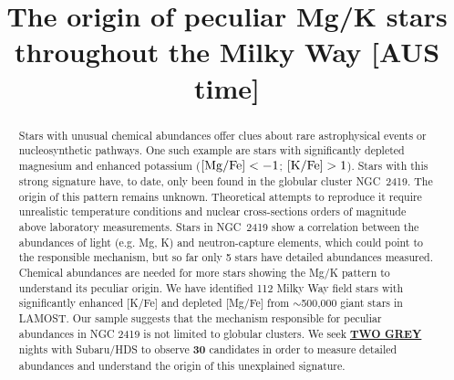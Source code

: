 \documentclass{article}
\begin{document}
\newcommand{\todo}[1]{\ul{\MakeUppercase{\textbf{#1}}}}
\newcommand{\NumStars}{30}
\newcommand{\NumNights}{two grey}
\semester{}
\proposalid{}
\receivedate{}


\title{The origin of peculiar Mg/K stars throughout the Milky Way [AUS time] }


\NormalStars

\begin{abstract}
Stars with unusual chemical abundances offer clues about rare astrophysical events or nucleosynthetic pathways. One such example are stars with significantly depleted magnesium and enhanced potassium ($[{\rm Mg/Fe}] < -1$; $[{\rm K/Fe}] > 1$). Stars with this strong signature have, to date, only been found in the globular cluster NGC~2419. The origin of this pattern remains unknown. Theoretical attempts to reproduce it require unrealistic temperature conditions and nuclear cross-sections orders of magnitude above laboratory measurements. Stars in NGC~2419 show a correlation between the abundances of light (e.g. Mg, K) and neutron-capture elements, which could point to the responsible mechanism, but so far only 5 stars have detailed abundances measured. Chemical abundances are needed for more stars showing the Mg/K pattern to understand its peculiar origin. We have identified 112 Milky Way field stars with significantly enhanced [K/Fe] and depleted [Mg/Fe] from $\sim$500,000 giant stars in LAMOST. Our sample suggests that the mechanism responsible for peculiar abundances in NGC 2419 is not limited to globular clusters. We seek \todo{\NumNights} nights with Subaru/HDS to observe \textbf{\NumStars} candidates in order to measure detailed abundances and understand the origin of this unexplained signature.
\end{abstract}
\end{document}
